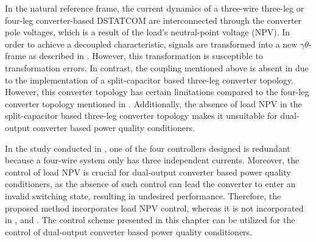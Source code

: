 In the natural reference frame, the current dynamics of a three-wire three-leg or four-leg converter-based DSTATCOM are interconnected through the converter pole voltages, which is a result of the load's neutral-point voltage (NPV). In order to achieve a decoupled characteristic, signals are transformed into a new $\gamma\theta$-frame as described in \cite{8264745}. However, this transformation is susceptible to transformation errors. In contrast, the coupling mentioned above is absent in \cite{8998568} due to the implementation of a split-capacitor based three-leg converter topology. However, this converter topology has certain limitations compared to the four-leg converter topology mentioned in \cite{5332351}. Additionally, the absence of load NPV in the split-capacitor based three-leg converter topology makes it unsuitable for dual-output converter based power quality conditioners.

In the study conducted in \cite{8281573}, one of the four controllers designed is redundant because a four-wire system only has three independent currents. Moreover, the control of load NPV is crucial for dual-output converter based power quality conditioners, as the absence of such control can lead the converter to enter an invalid switching state, resulting in undesired performance. Therefore, the proposed method incorporates load NPV control, whereas it is not incorporated in \cite{6880399,8264745,8281573}, and \cite{8998568}. The control scheme presented in this chapter can be utilized for the control of dual-output converter based power quality conditioners. 

